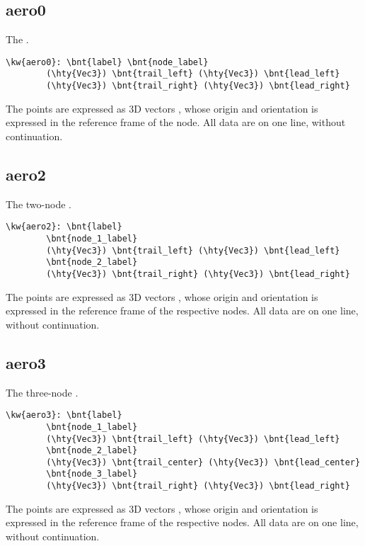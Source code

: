 \subsection{aero0}
The .
\begin{Verbatim}[commandchars=\\\{\}]
    \kw{aero0}: \bnt{label} \bnt{node_label}
        (\hty{Vec3}) \bnt{trail_left} (\hty{Vec3}) \bnt{lead_left}
        (\hty{Vec3}) \bnt{trail_right} (\hty{Vec3}) \bnt{lead_right}
\end{Verbatim}
The points are expressed as 3D vectors , whose origin and orientation
is expressed in the reference frame of the node.
All data are on one line, without continuation.

\subsection{aero2}
The two-node .
\begin{Verbatim}[commandchars=\\\{\}]
    \kw{aero2}: \bnt{label}
        \bnt{node_1_label}
        (\hty{Vec3}) \bnt{trail_left} (\hty{Vec3}) \bnt{lead_left}
        \bnt{node_2_label}
        (\hty{Vec3}) \bnt{trail_right} (\hty{Vec3}) \bnt{lead_right}
\end{Verbatim}
The points are expressed as 3D vectors , whose origin and orientation
is expressed in the reference frame of the respective nodes.
All data are on one line, without continuation.

\subsection{aero3}
The three-node .
\begin{Verbatim}[commandchars=\\\{\}]
    \kw{aero3}: \bnt{label}
        \bnt{node_1_label}
        (\hty{Vec3}) \bnt{trail_left} (\hty{Vec3}) \bnt{lead_left}
        \bnt{node_2_label}
        (\hty{Vec3}) \bnt{trail_center} (\hty{Vec3}) \bnt{lead_center}
        \bnt{node_3_label}
        (\hty{Vec3}) \bnt{trail_right} (\hty{Vec3}) \bnt{lead_right}
\end{Verbatim}
The points are expressed as 3D vectors , whose origin and orientation
is expressed in the reference frame of the respective nodes.
All data are on one line, without continuation.

